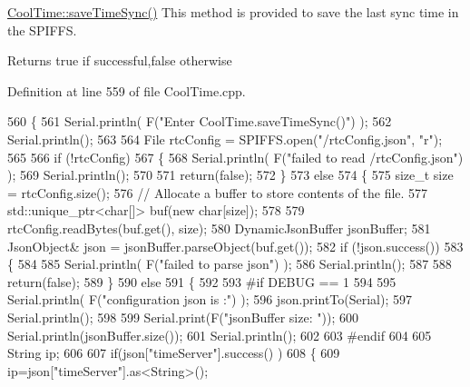 \hyperlink{class_cool_time_ae9658c9b377510d469e3b88edf33ee85}{Cool\+Time\+::save\+Time\+Sync()} This method is provided to save the last sync time in the S\+P\+I\+F\+FS.

\begin{DoxyReturn}{Returns}
true if successful,false otherwise 
\end{DoxyReturn}


Definition at line 559 of file Cool\+Time.\+cpp.


\begin{DoxyCode}
560 \{
561     Serial.println( F(\textcolor{stringliteral}{"Enter CoolTime.saveTimeSync()"}) );
562     Serial.println();
563 
564     File rtcConfig = SPIFFS.open(\textcolor{stringliteral}{"/rtcConfig.json"}, \textcolor{stringliteral}{"r"});
565 
566     \textcolor{keywordflow}{if} (!rtcConfig) 
567     \{
568         Serial.println( F(\textcolor{stringliteral}{"failed to read /rtcConfig.json"}) );
569         Serial.println();
570 
571         \textcolor{keywordflow}{return}(\textcolor{keyword}{false});
572     \}
573     \textcolor{keywordflow}{else}
574     \{
575         \textcolor{keywordtype}{size\_t} size = rtcConfig.size();
576         \textcolor{comment}{// Allocate a buffer to store contents of the file.}
577         std::unique\_ptr<char[]> buf(\textcolor{keyword}{new} \textcolor{keywordtype}{char}[size]);
578 
579         rtcConfig.readBytes(buf.get(), size);
580         DynamicJsonBuffer jsonBuffer;
581         JsonObject& json = jsonBuffer.parseObject(buf.get());
582         \textcolor{keywordflow}{if} (!json.success()) 
583         \{
584 
585             Serial.println( F(\textcolor{stringliteral}{"failed to parse json"}) );
586             Serial.println();
587 
588             \textcolor{keywordflow}{return}(\textcolor{keyword}{false});
589         \} 
590         \textcolor{keywordflow}{else}
591         \{
592 
593 \textcolor{preprocessor}{        #if DEBUG == 1}
594     
595             Serial.println( F(\textcolor{stringliteral}{"configuration json is :"}) );
596             json.printTo(Serial);
597             Serial.println();
598 
599             Serial.print(F(\textcolor{stringliteral}{"jsonBuffer size: "}));
600             Serial.println(jsonBuffer.size());
601             Serial.println();
602 
603 \textcolor{preprocessor}{        #endif}
604 
605             String ip;
606                     
607             \textcolor{keywordflow}{if}(json[\textcolor{stringliteral}{"timeServer"}].success() )
608             \{           
609                  ip=json[\textcolor{stringliteral}{"timeServer"}].as<String>();

\end{DoxyCode}

